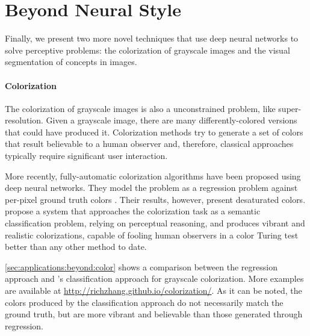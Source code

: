 
\section{Beyond Neural Style}
\label{sec:applications:beyond}

Finally, we present two more novel techniques that use deep neural networks to solve perceptive problems: the colorization of grayscale images and the visual segmentation of concepts in images.

\paragraph{Colorization}
The colorization of grayscale images is also a unconstrained problem, like super-resolution.
Given a grayscale image, there are many differently-colored versions that could have produced it.
Colorization methods try to generate a set of colors that result believable to a human observer and, therefore, classical approaches typically require significant user interaction.

More recently, fully-automatic colorization algorithms have been proposed using deep neural networks.
They model the problem as a regression problem against per-pixel ground truth colors \cite{Cheng2015}.
Their results, however, present desaturated colors.
\citet{Zhang2016} propose a system that approaches the colorization task as a semantic classification problem, relying on perceptual reasoning, and produces vibrant and realistic colorizations, capable of fooling human observers in a color Turing test better than any other method to date.

\autoref{sec:applications:beyond:color} shows a comparison between the regression approach and \citeauthor{Zhang2016}'s classification approach for grayscale colorization.
More examples are available at \url{http://richzhang.github.io/colorization/}.
As it can be noted, the colors produced by the classification approach do not necessarily match the ground truth, but are more vibrant and believable than those generated through regression.

